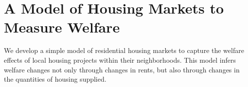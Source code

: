 \documentclass[12pt]{article}
\begin{document}













\section{A Model of Housing Markets to Measure Welfare}\label{section:theory}

We develop a simple model of residential housing markets to capture the welfare effects of local housing projects within their neighborhoods.  This model infers welfare changes not only through changes in rents, but also through changes in the quantities of housing supplied.  
\end{document}
